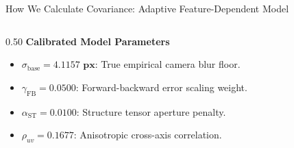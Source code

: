 \documentclass[aspectratio=169, 10pt]{beamer}
\begin{document}
\begin{frame}{How We Calculate Covariance: Adaptive Feature-Dependent Model}
\begin{columns}[T]
\begin{column}{0.50\textwidth}
      {\small \textbf{\textcolor{EmeraldGreen}{Calibrated Model Parameters}}}\\
      \scriptsize
      \begin{itemize}
        \setlength{\itemsep}{1.5pt}
        \item $\sigma_{\text{base}} = \mathbf{4.1157\text{ px}}$: True empirical camera blur floor.
        \item $\gamma_{\text{FB}} = \mathbf{0.0500}$: Forward-backward error scaling weight.
        \item $\alpha_{\text{ST}} = \mathbf{0.0100}$: Structure tensor aperture penalty.
        \item $\rho_{uv} = \mathbf{0.1677}$: Anisotropic cross-axis correlation.
      \end{itemize}
    \end{column}
  \end{columns}
\end{frame}
\end{document}
